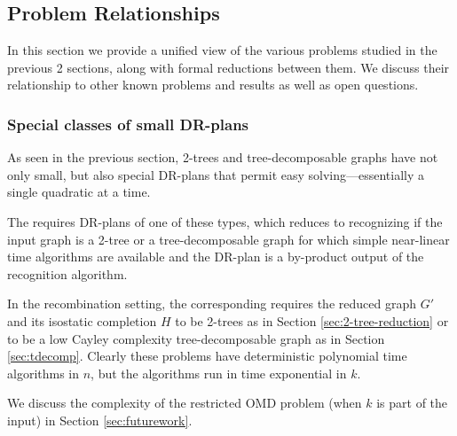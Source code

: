 \subsection{Problem Relationships}
\label{sec:table}

In this section we provide a unified view of the various problems studied in the previous 2 sections, along with formal reductions between them. We discuss their relationship to other known problems and results as well as open questions.





\subsubsection{Special classes of small DR-plans}
As seen in the previous section, 2-trees and tree-decomposable graphs have not only small, but also special DR-plans that permit easy solving---essentially a single quadratic at a time.

The  requires DR-plans of one of these types, which reduces to recognizing if the input graph is a 2-tree or a tree-decomposable graph for which simple near-linear time algorithms are available \cite{valdes1979recognition,fudos1997graph} and the DR-plan is a by-product output of the recognition algorithm.

In the recombination setting, the corresponding  requires the reduced graph $G'$ and its isostatic completion $H$ to be 2-trees as in Section \ref{sec:2-tree-reduction} or to be a low Cayley complexity tree-decomposable graph as in Section \ref{sec:tdecomp}. Clearly these problems have deterministic polynomial time algorithms in $n$, but the algorithms run in time exponential in $k$.

We discuss the complexity of the restricted OMD problem (when $k$ is part of the input) in Section \ref{sec:futurework}.

